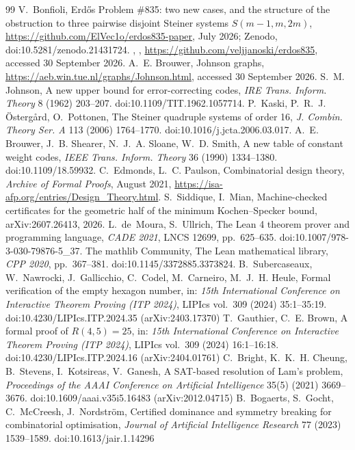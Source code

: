 \documentclass[11pt]{article}
\theoremstyle{plain}
\newcommand{\ext}[1]{\brktt{#1}}
\begin{document}
\begin{thebibliography}{99}
 V.~Bonfioli, Erd\H{o}s Problem \#835: two new cases, and the structure of the obstruction to three pairwise disjoint Steiner systems $S(m-1,m,2m)$, \url{https://github.com/ElVec1o/erdos835-paper}, July 2026; Zenodo, doi:10.5281/zenodo.21431724.
 \ext{veljjanoski}, \ext{erdos835}, \url{https://github.com/veljjanoski/erdos835}, accessed 30 September 2026.
 A.~E. Brouwer, Johnson graphs, \url{https://aeb.win.tue.nl/graphs/Johnson.html}, accessed 30 September 2026.
 S.~M. Johnson, A new upper bound for error-correcting codes, \emph{IRE Trans. Inform. Theory} 8 (1962) 203--207. doi:10.1109/TIT.1962.1057714.
 P.~Kaski, P.~R.~J. \"Osterg\aa{}rd, O.~Pottonen, The Steiner quadruple systems of order 16, \emph{J. Combin. Theory Ser. A} 113 (2006) 1764--1770. doi:10.1016/j.jcta.2006.03.017.
 A.~E. Brouwer, J.~B. Shearer, N.~J.~A. Sloane, W.~D. Smith, A new table of constant weight codes, \emph{IEEE Trans. Inform. Theory} 36 (1990) 1334--1380. doi:10.1109/18.59932.
 C.~Edmonds, L.~C. Paulson, Combinatorial design theory, \emph{Archive of Formal Proofs}, August 2021, \url{https://isa-afp.org/entries/Design_Theory.html}.
 S.~Siddique, I.~Mian, Machine-checked certificates for the geometric half of the minimum Kochen--Specker bound, arXiv:2607.26413, 2026.
 L.~de~Moura, S.~Ullrich, The Lean 4 theorem prover and programming language, \emph{CADE 2021}, LNCS 12699, pp.~625--635. doi:10.1007/978-3-030-79876-5\_37.
 The mathlib Community, The Lean mathematical library, \emph{CPP 2020}, pp.~367--381. doi:10.1145/3372885.3373824.
 B.~Subercaseaux, W.~Nawrocki, J.~Gallicchio, C.~Codel, M.~Carneiro, M.~J.~H. Heule, Formal verification of the empty hexagon number, in: \emph{15th International Conference on Interactive Theorem Proving (ITP 2024)}, LIPIcs vol.~309 (2024) 35:1--35:19. doi:10.4230/LIPIcs.ITP.2024.35 (arXiv:2403.17370)
 T.~Gauthier, C.~E. Brown, A formal proof of $R(4,5)=25$, in: \emph{15th International Conference on Interactive Theorem Proving (ITP 2024)}, LIPIcs vol.~309 (2024) 16:1--16:18. doi:10.4230/LIPIcs.ITP.2024.16 (arXiv:2404.01761)
 C.~Bright, K.~K.~H. Cheung, B.~Stevens, I.~Kotsireas, V.~Ganesh, A SAT-based resolution of Lam's problem, \emph{Proceedings of the AAAI Conference on Artificial Intelligence} 35(5) (2021) 3669--3676. doi:10.1609/aaai.v35i5.16483 (arXiv:2012.04715)
 B.~Bogaerts, S.~Gocht, C.~McCreesh, J.~Nordstr\"om, Certified dominance and symmetry breaking for combinatorial optimisation, \emph{Journal of Artificial Intelligence Research} 77 (2023) 1539--1589. doi:10.1613/jair.1.14296

\end{thebibliography}
\end{document}
